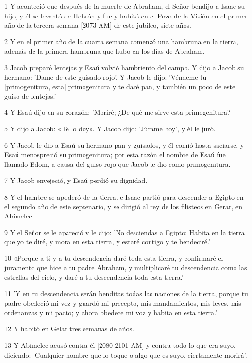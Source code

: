 \par 1 Y aconteció que después de la muerte de Abraham, el Señor bendijo a Isaac su hijo, y él se levantó de Hebrón y fue y habitó en el Pozo de la Visión en el primer año de la tercera semana [2073 AM] de este jubileo, siete años.
\par 2 Y en el primer año de la cuarta semana comenzó una hambruna en la tierra, además de la primera hambruna que hubo en los días de Abraham.
\par 3 Jacob preparó lentejas y Esaú volvió hambriento del campo. Y dijo a Jacob su hermano: 'Dame de este guisado rojo'. Y Jacob le dijo: 'Véndeme tu [primogenitura, esta] primogenitura y te daré pan, y también un poco de este guiso de lentejas.'
\par 4 Y Esaú dijo en su corazón: 'Moriré; ¿De qué me sirve esta primogenitura?
\par 5 Y dijo a Jacob: «Te lo doy». Y Jacob dijo: 'Júrame hoy', y él le juró.
\par 6 Y Jacob le dio a Esaú su hermano pan y guisados, y él comió hasta saciarse, y Esaú menospreció su primogenitura; por esta razón el nombre de Esaú fue llamado Edom, a causa del guiso rojo que Jacob le dio como primogenitura.
\par 7 Y Jacob envejeció, y Esaú perdió su dignidad.
\par 8 Y el hambre se apoderó de la tierra, e Isaac partió para descender a Egipto en el segundo año de este septenario, y se dirigió al rey de los filisteos en Gerar, en Abimelec.
\par 9 Y el Señor se le apareció y le dijo: 'No desciendas a Egipto; Habita en la tierra que yo te diré, y mora en esta tierra, y estaré contigo y te bendeciré.'
\par 10 «Porque a ti y a tu descendencia daré toda esta tierra, y confirmaré el juramento que hice a tu padre Abraham, y multiplicaré tu descendencia como las estrellas del cielo, y daré a tu descendencia toda esta tierra.'
\par 11 'Y en tu descendencia serán benditas todas las naciones de la tierra, porque tu padre obedeció mi voz y guardó mi precepto, mis mandamientos, mis leyes, mis ordenanzas y mi pacto; y ahora obedece mi voz y habita en esta tierra.'
\par 12 Y habitó en Gelar tres semanas de años.
\par 13 Y Abimelec acusó contra él [2080-2101 AM] y contra todo lo que era suyo, diciendo: 'Cualquier hombre que lo toque o algo que es suyo, ciertamente morirá'.
